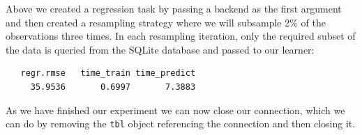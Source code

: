 \begin{Shaded}
\begin{Highlighting}[]
\OtherTok{=}  \NormalTok{,}
   \NormalTok{)}
\OtherTok{=} \NormalTok{(}\NormalTok{, } \NormalTok{, } \NormalTok{)}
\end{Highlighting}
\end{Shaded}

Above we created a regression task by passing a backend as the first
argument and then created a resampling strategy where we will subsample
2\% of the observations three times. In each resampling iteration, only
the required subset of the data is queried from the SQLite database and
passed to our learner:

\begin{Shaded}
\begin{Highlighting}[]
\OtherTok{=} \NormalTok{(}
\OtherTok{=} \NormalTok{(}\NormalTok{(}\NormalTok{, }\NormalTok{, }\NormalTok{))}
\SpecialCharTok{$}
\end{Highlighting}
\end{Shaded}

\begin{verbatim}
   regr.rmse   time_train time_predict 
     35.9536       0.6997       7.3883 
\end{verbatim}

As we have finished our experiment we can now close our connection,
which we can do by removing the \texttt{tbl} object referencing the
connection and then closing it.

\begin{Shaded}
\begin{Highlighting}[]
\SpecialCharTok{::}
\end{Highlighting}
\end{Shaded}

